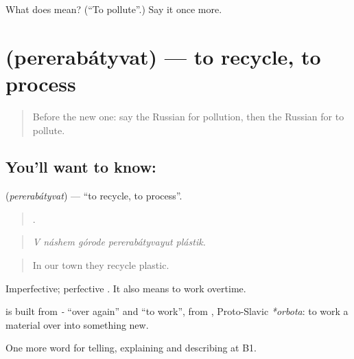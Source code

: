 \begin{tcolorbox}[breakable,colback=teal!4,colframe=teal!35!black,title={Before you move on}]
What does  mean? (\textquotedblleft{}To pollute\textquotedblright{}.) Say it once more.
\end{tcolorbox}
\section[\texorpdfstring{\ru{перерабатывать} (pererabátyvat)}{перерабатывать (pererabátyvat)}]{ (pererabátyvat) — to recycle, to process}

\label{lesson:RU-C369-pererabatyvat}



\begin{quote}
Before the new one: say the Russian for pollution, then the Russian for to pollute.
\end{quote}

\subsection*{You'll want to know: }
\textbf{} (\emph{pererabátyvat}) — \textquotedblleft{}to recycle, to process\textquotedblright{}.

\begin{quote}
    .
\end{quote}

\begin{quote}
\emph{V náshem górode pererabátyvayut plástik.}
\end{quote}

\begin{quote}
In our town they recycle plastic.
\end{quote}

Imperfective; perfective \emph{}. It also means to work overtime.

\begin{cousinweb}
\textbf{} is built from \emph{-} \textquotedblleft{}over again\textquotedblright{} and \emph{} \textquotedblleft{}to work\textquotedblright{}, from \emph{}, Proto-Slavic \emph{*orbota}: to work a material over into something new.
\end{cousinweb}

\begin{grammarlens}[title={What you've built}]
One more word for telling, explaining and describing at B1.
\end{grammarlens}

